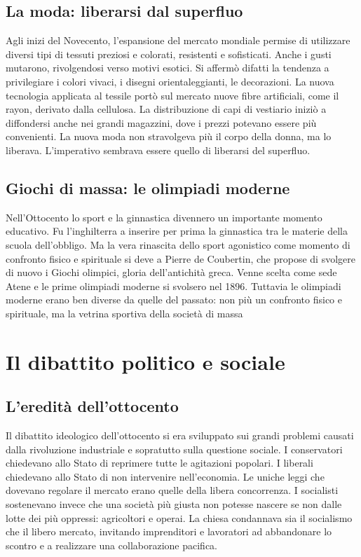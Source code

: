 \documentclass{report}
\begin{document}
\subsection{La moda: liberarsi dal superfluo}
Agli inizi del Novecento, l'espansione del mercato mondiale permise di utilizzare diversi tipi di tessuti preziosi e colorati, resistenti e sofisticati. Anche i gusti mutarono, rivolgendosi verso motivi esotici. Si affermò difatti la tendenza a privilegiare i colori vivaci, i disegni orientaleggianti, le decorazioni. La nuova tecnologia applicata al tessile portò sul mercato nuove fibre artificiali, come il rayon, derivato dalla cellulosa. La distribuzione di capi di vestiario iniziò a diffondersi anche nei grandi magazzini, dove i prezzi potevano essere più convenienti. La nuova moda non stravolgeva più il corpo della donna, ma lo liberava. L'imperativo sembrava essere quello di liberarsi del superfluo.

\subsection{Giochi di massa: le olimpiadi moderne}
Nell'Ottocento lo sport e la ginnastica divennero un importante momento educativo.
Fu l'inghilterra a inserire per prima la ginnastica tra le materie della scuola dell'obbligo. Ma la vera rinascita dello sport agonistico come momento di confronto fisico e spirituale si deve a Pierre de Coubertin, che propose di svolgere di nuovo i Giochi olimpici, gloria dell'antichità greca. Venne scelta come sede Atene e le prime olimpiadi moderne si svolsero nel 1896. Tuttavia le olimpiadi moderne erano ben diverse da quelle del passato: non più un confronto fisico e spirituale, ma la vetrina sportiva della società di massa

\section{Il dibattito politico e sociale}

\subsection{L'eredità dell'ottocento}
Il dibattito ideologico dell'ottocento si era sviluppato sui grandi problemi causati dalla rivoluzione industriale e sopratutto sulla questione sociale.
I conservatori chiedevano allo Stato di reprimere tutte le agitazioni popolari.
I liberali chiedevano allo Stato di non intervenire nell'economia. 
Le uniche leggi che dovevano regolare il mercato erano quelle della libera concorrenza.
I socialisti sostenevano invece che una società più giusta non potesse nascere se non dalle lotte dei più oppressi: agricoltori e operai.
La chiesa condannava sia il socialismo che il libero mercato, invitando imprenditori e lavoratori ad abbandonare lo scontro e a realizzare una collaborazione pacifica.
\end{document}
